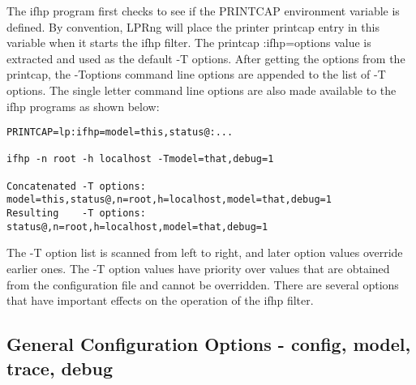 \documentclass[a4paper]{article}
\begin{document}
The {\ttfamily ifhp} program first checks to see if the
{\ttfamily PRINTCAP} environment variable is defined.
By convention, {\ttfamily LPRng} will place the printer printcap entry in this
variable when it starts the {\ttfamily ifhp} filter.
The printcap {\ttfamily :ifhp=options} value is extracted and used
as the default {\ttfamily -T} options.
After getting the options from the printcap,
the {\ttfamily -Toptions} command line options are appended to the list of {\ttfamily -T}
options.
The single letter command line options are also made available to
the {\ttfamily ifhp} programs as shown below:
\begin{tscreen}
\begin{verbatim}
PRINTCAP=lp:ifhp=model=this,status@:...

ifhp -n root -h localhost -Tmodel=that,debug=1

Concatenated -T options:  model=this,status@,n=root,h=localhost,model=that,debug=1
Resulting    -T options:  status@,n=root,h=localhost,model=that,debug=1
\end{verbatim}
\end{tscreen}


The {\ttfamily -T} option list is scanned from left to right,
and later option values override earlier ones.
The {\ttfamily -T} option values have priority over values that are obtained
from the configuration file and cannot be overridden.
There are several options that have important effects on the operation
of the {\ttfamily ifhp} filter.


\subsection{General Configuration Options - config, model, trace, debug
\label{config}
\label{trace}
\label{debug}}
\end{document}
